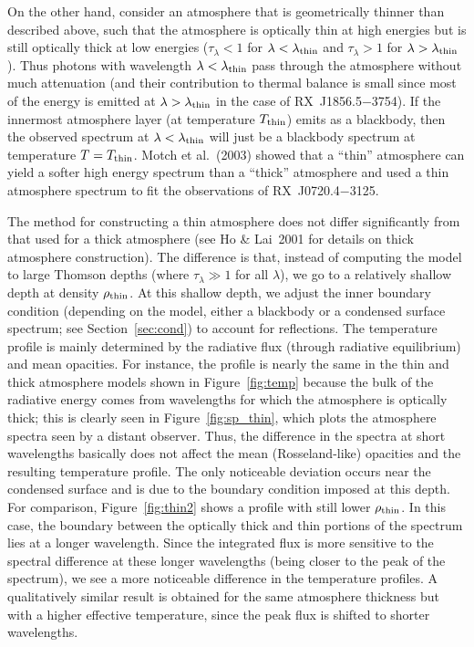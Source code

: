 \documentclass[useAMS,usegraphicx]{mn2e}
\newcommand{\etal}{et al.}
\newcommand{\rxjw}{RX~J1856.5$-$3754}
\newcommand{\lambatm}{\lambda_{\rm thin}}
\newcommand{\tatm}{T_{\rm thin}}
\newcommand{\taulam}{\tau_\lambda}
\begin{document}
On the other hand, consider an atmosphere that is geometrically thinner
than described above, such that the atmosphere is optically thin at high
energies but is still optically thick at low energies
($\taulam<1$ for $\lambda<\lambatm$ and $\taulam>1$ for $\lambda>\lambatm$).
Thus photons with wavelength $\lambda<\lambatm$ pass through the
atmosphere without much attenuation
(and their contribution to thermal balance is small since most of the
energy is emitted at $\lambda>\lambatm$ in the case of \rxjw).
If the innermost atmosphere layer (at temperature $\tatm$) emits as
a blackbody, then the observed spectrum at $\lambda<\lambatm$ will
just be a blackbody spectrum at temperature $T=\tatm$.
Motch \etal~(2003) showed that a ``thin'' atmosphere can yield a
softer high energy spectrum than a ``thick'' atmosphere
and used a thin atmosphere spectrum to fit the observations of
RX~J0720.4$-$3125.

The method for constructing a thin atmosphere does not differ significantly
from that used for a thick atmosphere (see Ho \& Lai~2001 for details on
thick atmosphere construction).  The difference is that, instead
of computing the model to large Thomson depths (where $\taulam \gg 1$
for all $\lambda$), we go to a relatively shallow depth at density
$\rho_{\rm thin}$.  At this shallow depth, we adjust the inner boundary
condition (depending on the model, either a blackbody or a condensed
surface spectrum; see Section~\ref{sec:cond}) to account for reflections.
The temperature profile is mainly determined by the radiative flux
(through radiative equilibrium) and mean opacities.
For instance, the profile is nearly the same in the thin and thick
atmosphere models shown in Figure~\ref{fig:temp} because the bulk
of the radiative energy comes from wavelengths for which the atmosphere is
optically thick; this is clearly seen in Figure~\ref{fig:sp_thin},
which plots the atmosphere spectra seen by a distant observer.
Thus, the difference in the spectra at short wavelengths basically does not
affect the mean (Rosseland-like) opacities and the resulting temperature
profile.  The only noticeable deviation occurs near the condensed surface
and is due to the boundary condition imposed at this depth.
For comparison, Figure~\ref{fig:thin2} shows a profile with still lower
$\rho_{\rm thin}$.  In this case, the boundary between the
optically thick and thin portions of the spectrum lies at a longer
wavelength.  Since the integrated flux is more sensitive to the spectral
difference at these longer wavelengths (being closer to the peak of the
spectrum), we see a more noticeable difference in the temperature profiles.
A qualitatively similar result is obtained for the same atmosphere
thickness but with a higher effective temperature, since the peak flux is
shifted to shorter wavelengths.
 
\end{document}
